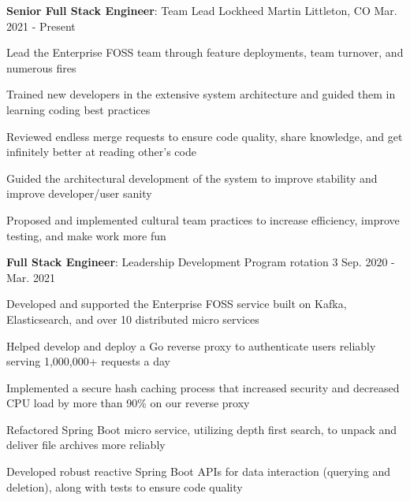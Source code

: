 


\begin{cventries}

\vspace{-.25em}
\cventry
{\textbf{Senior Full Stack Engineer}: Team Lead} %
{Lockheed Martin} %
{Littleton, CO} %
{Mar. 2021 - Present} %
{ %
\begin{cvitems}
    \item {Lead the Enterprise FOSS team through feature deployments, team turnover, and numerous fires}
    \item {Trained new developers in the extensive system architecture and guided them in learning coding best practices}
    \item {Reviewed endless merge requests to ensure code quality, share knowledge, and get infinitely better at reading other's code}
    \item {Guided the architectural development of the system to improve stability and improve developer/user sanity}
    \item {Proposed and implemented cultural team practices to increase efficiency, improve testing, and make work more fun}
\end{cvitems}
}

\vspace{-1.25em}
\cventry
{\textbf{Full Stack Engineer}: Leadership Development Program rotation 3} %
{} %
{} %
{Sep. 2020 - Mar. 2021} %
{ %
\begin{cvitems}
\item {Developed and supported the Enterprise FOSS service built on Kafka, Elasticsearch, and over 10 distributed micro services}
\item {Helped develop and deploy a Go reverse proxy to authenticate users reliably serving 1,000,000+ requests a day}
\item {Implemented a secure hash caching process that increased security and decreased CPU load by more than 90\% on our reverse proxy}
\item {Refactored Spring Boot micro service, utilizing depth first search, to unpack and deliver file archives more reliably}
\item {Developed robust reactive Spring Boot APIs for data interaction (querying and deletion), along with tests to ensure code quality}
\end{cvitems}
}


\end{cventries}
